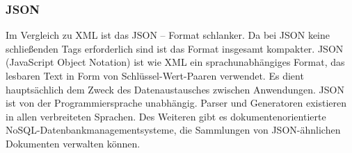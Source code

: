 \documentclass[asp1.tex]{subfiles}
\begin{document}
\subsubsection{JSON}

Im Vergleich zu XML ist das JSON – Format schlanker. Da bei JSON keine schließenden Tags erforderlich sind ist das Format insgesamt kompakter. JSON (JavaScript Object Notation) ist wie XML ein sprachunabhängiges Format, das lesbaren Text in Form von Schlüssel-Wert-Paaren verwendet. Es dient hauptsächlich dem Zweck des Datenaustausches zwischen Anwendungen. JSON ist von der Programmiersprache unabhängig. Parser und Generatoren existieren in allen verbreiteten Sprachen. Des Weiteren gibt es dokumentenorientierte NoSQL-Datenbankmanagementsysteme, die Sammlungen von JSON-ähnlichen Dokumenten verwalten können.

\break
\end{document}
